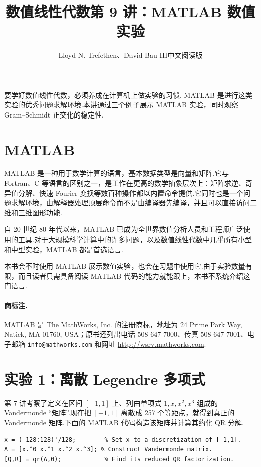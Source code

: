 \documentclass[UTF8,fontset=none,12pt]{ctexart}
\title{数值线性代数\quad 第 9 讲：MATLAB 数值实验}
\author{Lloyd N. Trefethen、David Bau III\quad 中文阅读版}
\date{}
\begin{document}
\maketitle
\pagestyle{plain}

要学好数值线性代数，必须养成在计算机上做实验的习惯. MATLAB\textsuperscript{\textregistered} 是进行这类实验的优秀问题求解环境.本讲通过三个例子展示 MATLAB 实验，同时观察 Gram--Schmidt 正交化的稳定性.

\section*{MATLAB}

MATLAB 是一种用于数学计算的语言，基本数据类型是向量和矩阵.它与 Fortran、C 等语言的区别之一，是工作在更高的数学抽象层次上：矩阵求逆、奇异值分解、快速 Fourier 变换等数百种操作都以内置命令提供.它同时也是一个问题求解环境，由解释器处理顶层命令而不是由编译器先编译，并且可以直接访问二维和三维图形功能.

自 20 世纪 80 年代以来，MATLAB 已成为全世界数值分析人员和工程师广泛使用的工具.对于大规模科学计算中的许多问题，以及数值线性代数中几乎所有小型和中型实验，MATLAB 都是首选语言.

本书会不时使用 MATLAB 展示数值实验，也会在习题中使用它.由于实验数量有限，而且读者只需具备阅读 MATLAB 代码的能力就能跟上，本书不系统介绍这门语言.

\paragraph{商标注.} MATLAB 是 The MathWorks, Inc. 的注册商标，地址为 24 Prime Park Way, Natick, MA 01760, USA；原书还列出电话 508-647-7000、传真 508-647-7001、电子邮箱 \texttt{info@mathworks.com} 和网址 \url{http://wsrv.mathworks.com}.

\section*{实验 1：离散 Legendre 多项式}

第 7 讲考察了定义在区间 $[-1,1]$ 上、列由单项式 $1,x,x^2,x^3$ 组成的 Vandermonde “矩阵”.现在把 $[-1,1]$ 离散成 257 个等距点，就得到真正的 Vandermonde 矩阵.下面的 MATLAB 代码构造该矩阵并计算其约化 QR 分解.

\begin{verbatim}
x = (-128:128)'/128;        % Set x to a discretization of [-1,1].
A = [x.^0 x.^1 x.^2 x.^3]; % Construct Vandermonde matrix.
[Q,R] = qr(A,0);            % Find its reduced QR factorization.
\end{verbatim}
\end{document}
